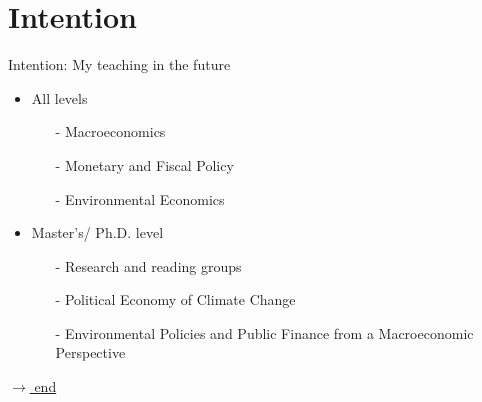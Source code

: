 \hypertarget{int}{}
\section*{Intention}
\begin{frame}{Intention: My teaching in the future}


\begin{itemize}[<+->]
	\item All levels
	\begin{itemize}
		\item[-] Macroeconomics
		\item[-] Monetary and Fiscal Policy
		\item[-] Environmental Economics 
	\end{itemize}
\vspace{2mm}
	\item Master's/ Ph.D. level
	\begin{itemize}
		\item[-] Research and reading groups
		\item[-] Political Economy of Climate Change
		\item[-] \alert{Environmental Policies and Public Finance from a Macroeconomic Perspective}
	\end{itemize}
\end{itemize}

\vspace{26mm}
\hfill \hyperlink{end}{\tiny{$\rightarrow$ end}}
\end{frame}
